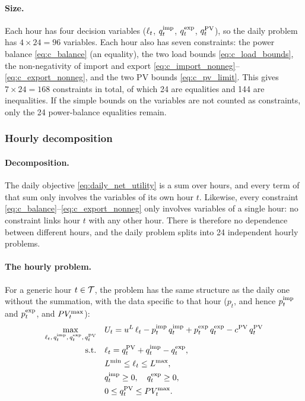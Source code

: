 \paragraph{Size.}
Each hour has four decision variables ($\ell_{t}$, $q^{\mathrm{imp}}_{t}$, $q^{\mathrm{exp}}_{t}$, $q^{\mathrm{PV}}_{t}$), so the daily
problem has $4 \times 24 = 96$ variables. Each hour also has seven constraints: the power
balance \eqref{eq:c_balance} (an equality), the two load bounds \eqref{eq:c_load_bounds},
the non-negativity of import and export \eqref{eq:c_import_nonneg}--\eqref{eq:c_export_nonneg},
and the two PV bounds \eqref{eq:c_pv_limit}. This gives $7 \times 24 = 168$ constraints in
total, of which 24 are equalities and 144 are inequalities. If the simple bounds on the
variables are not counted as constraints, only the 24 power-balance equalities remain.

\subsubsection{Hourly decomposition}

\paragraph{Decomposition.}
The daily objective \eqref{eq:daily_net_utility} is a sum over hours, and every term of
that sum only involves the variables of its own hour $t$. Likewise, every constraint
\eqref{eq:c_balance}--\eqref{eq:c_export_nonneg} only involves variables of a single hour: no
constraint links hour $t$ with any other hour. There is therefore no dependence between
different hours, and the daily problem splits into 24 independent hourly problems.

\paragraph{The hourly problem.}
For a generic hour $t \in \mathcal{T}$, the problem has the same structure as the daily one without
the summation, with the data specific to that hour ($p_t$, and hence $p^{\mathrm{imp}}_{t}$ and $p^{\mathrm{exp}}_{t}$,
and $PV_{t}^{\max}$):
\begin{align}
    \max_{\ell_{t},\, q^{\mathrm{imp}}_{t},\, q^{\mathrm{exp}}_{t},\, q^{\mathrm{PV}}_{t}} \quad
    & U_t = u^{L} \, \ell_{t} - p^{\mathrm{imp}}_{t} \, q^{\mathrm{imp}}_{t} + p^{\mathrm{exp}}_{t} \, q^{\mathrm{exp}}_{t} - c^{\mathrm{PV}} \, q^{\mathrm{PV}}_{t} \\
    \text{s.t.} \quad
    & \ell_{t} = q^{\mathrm{PV}}_{t} + q^{\mathrm{imp}}_{t} - q^{\mathrm{exp}}_{t}, \\
    & L^{\min} \leq \ell_{t} \leq L^{\max}, \\
    & q^{\mathrm{imp}}_{t} \geq 0, \quad q^{\mathrm{exp}}_{t} \geq 0, \\
    & 0 \leq q^{\mathrm{PV}}_{t} \leq PV_{t}^{\max}.
\end{align}

